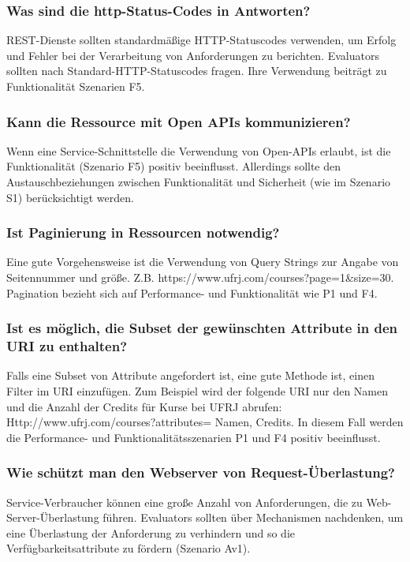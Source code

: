 \documentclass{acmsiggraph}
\begin{document}
\subsubsection{Was sind die http-Status-Codes in Antworten?}
REST-Dienste sollten standardmäßige HTTP-Statuscodes verwenden, um Erfolg und Fehler bei der Verarbeitung von Anforderungen zu berichten.
Evaluators sollten nach Standard-HTTP-Statuscodes fragen. Ihre Verwendung beiträgt zu Funktionalität Szenarien F5.
\subsubsection{Kann die Ressource mit Open APIs kommunizieren?}
Wenn eine Service-Schnittstelle die Verwendung von Open-APIs erlaubt, ist die Funktionalität (Szenario F5) positiv beeinflusst.
Allerdings sollte den Austauschbeziehungen zwischen Funktionalität und Sicherheit (wie im Szenario S1) berücksichtigt werden.
\subsubsection{Ist Paginierung in Ressourcen notwendig?}
Eine gute Vorgehensweise ist die Verwendung von Query Strings zur Angabe von Seitennummer und größe. 
Z.B. https://www.ufrj.com/courses?page=1\&size=30. 
Pagination bezieht sich auf Performance- und Funktionalität wie P1 und F4.
\subsubsection{Ist es möglich, die Subset der gewünschten Attribute in den URI zu enthalten?}

Falls eine Subset von Attribute angefordert ist, eine gute Methode ist, einen Filter im URI einzufügen. Zum Beispiel wird der folgende URI nur den Namen und die Anzahl der Credits für Kurse bei UFRJ abrufen:
Http://www.ufrj.com/courses?attributes= Namen, Credits.
In diesem Fall werden die Performance- und Funktionalitätsszenarien P1 und F4 positiv beeinflusst.

\subsubsection{Wie schützt man den Webserver von Request-Überlastung?}
Service-Verbraucher können eine große Anzahl von Anforderungen, die zu Web-Server-Überlastung führen.
Evaluators sollten über Mechanismen nachdenken, um eine Überlastung der Anforderung zu verhindern und so die Verfügbarkeitsattribute zu fördern (Szenario Av1).
\end{document}
